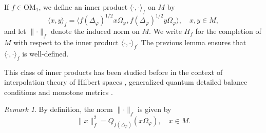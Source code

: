 \documentclass[a4paper,12pt]{amsart}
\newcommand{\ip}[2]{\langle#1,#2\rangle}
\newcommand{\norm}[1]{\lVert#1\rVert}
\newcommand{\OM}{\mathrm{OM}}
\renewcommand{\phi}{\varphi}
\theoremstyle{plain}
\theoremstyle{remark}
\newtheorem{remark}[proposition]{Remark}
\theoremstyle{definition}
\begin{document}
If $f\in \OM_1$, we define an inner product $\ip{\cdot}{\cdot}_f$ on $M$ by
\begin{equation*}
    \ip{x}{y}_f=\langle f(\Delta_\phi)^{1/2}x\Omega_\phi,f(\Delta_\phi)^{1/2}y\Omega_\phi\rangle,\quad x,y\in M,
\end{equation*}
and let $\norm\cdot_f$ denote the induced norm on $M$. We write $H_f$ for the completion of $M$ with respect to the inner product $\ip{\cdot}{\cdot}_f$. The previous lemma ensures that $\ip\cdot\cdot_f$ is well-defined.

This class of inner products has been studied before in the context of interpolation theory of Hilbert spaces \cite{Don67}, generalized quantum detailed balance conditions \cite{TKRWV10} and monotone metrics \cite{Pet96}.

\begin{remark}
    By definition, the norm $\norm\cdot_f$ is given by
    \begin{equation*}
        \norm{x}_f^2=Q_{f(\Delta_\phi)}(x\Omega_\phi),\quad x\in M.
    \end{equation*}
\end{remark}
\end{document}
